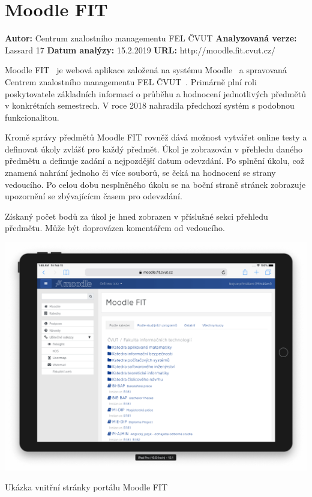 \section{Moodle FIT}

\textbf{Autor:} Centrum znalostního managementu FEL ČVUT\newline
\textbf{Analyzovaná verze:} Lassard 17\newline
\textbf{Datum analýzy:} 15.2.2019\newline
\textbf{URL:} http://moodle.fit.cvut.cz/

Moodle FIT~\cite{moodleFit} je webová aplikace založená na systému Moodle~\cite{moodle} a spravovaná Centrem znalostního managementu FEL ČVUT~\cite{czm}. Primárně plní roli poskytovatele základních informací o průběhu a hodnocení jednotlivých předmětů v konkrétních semestrech. V roce 2018 nahradila předchozí systém s podobnou funkcionalitou.

Kromě správy předmětů Moodle FIT rovněž dává možnost vytvářet online testy a definovat úkoly zvlášť pro každý předmět. Úkol je zobrazován v přehledu daného předmětu a definuje zadání a nejpozdější datum odevzdání. Po splnění úkolu, což znamená nahrání jednoho či více souborů, se čeká na hodnocení se strany vedoucího. Po celou dobu nesplněného úkolu se na boční straně stránek zobrazuje upozornění se zbývajícícm časem pro odevzdání.

Získaný počet bodů za úkol je hned zobrazen v příslušné sekci přehledu předmětu. Může být doprovázen komentářem od vedoucího.


\begin{fig:illustration}
   \includegraphics[width=1\textwidth]{images/analyza-moodle.png}
   \caption{Ukázka vnitřní stránky portálu Moodle FIT}\label{pic:analyza-moodle}
\end{fig:illustration}


